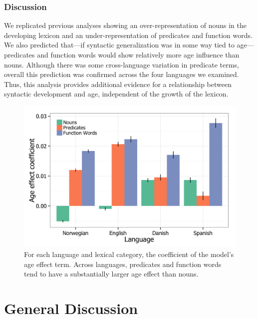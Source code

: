 \documentclass[10pt,letterpaper]{article}
\begin{document}
\subsubsection{Discussion}

We replicated previous analyses \cite{bates1994} showing an over-representation of nouns in the developing lexicon and an under-representation of predicates and function words. We also predicted that---if syntactic generalization was in some way tied to age---predicates and function words would show relatively more age influence than nouns. Although there was some cross-language variation in predicate terms, overall this prediction was confirmed across the four languages we examined. Thus, this analysis provides additional evidence for a relationship between syntactic development and age, independent of the growth of the lexicon.

\begin{figure}[tb]
\centering
\includegraphics[width=\linewidth]{plots/coefs_vocab_comp.png}
\caption{\label{fig:coefs_vocab_comp} For each language and lexical category, the coefficient of the model's age effect term. Across languages, predicates and function words tend to have a substantially larger age effect than nouns.}
\end{figure}

\section{General Discussion}
\end{document}
